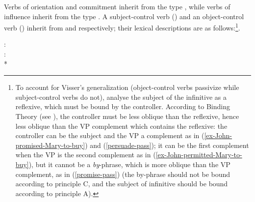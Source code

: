 \documentclass[output=paper
	        ,collection
	        ,collectionchapter
 	        ,biblatex
                ,babelshorthands
                ,newtxmath
                ,draftmode
                ,colorlinks, citecolor=brown
]{langscibook}
\begin{document}
Verbs of orientation and commitment inherit from the type , while verbs of influence inherit from the type .
A subject-control verb () and an object-control verb () inherit from  and  respectively; their lexical descriptions are as follows:\footnote{To account for Visser's generalization (object-control verbs passivize  while subject-control verbs do not), \citet{SagandPollard1991} analyse the subject of the infinitive as a reflexive, which must be bound by the controller. According to Binding Theory (see ), the controller must be less oblique than the reflexive, hence less oblique than the VP complement which contains the reflexive: the controller can be the subject and the VP a complement as in (\ref{ex-John-promised-Mary-to-buy}) and (\ref{persuade-pass}); it can be the first complement when the VP is the second complement as in (\ref{ex-John-permitted-Mary-to-buy}), but it cannot be a  \emph{by}-phrase, which is more oblique than the VP complement, as in (\ref{promise-pass}) (the by-phrase should not be bound according to principle C, and the subject of infinitive should be bound according to principle A).}.

\eas
{}:\\
\zs
\eas
{}:\\*
\zs
\end{document}
